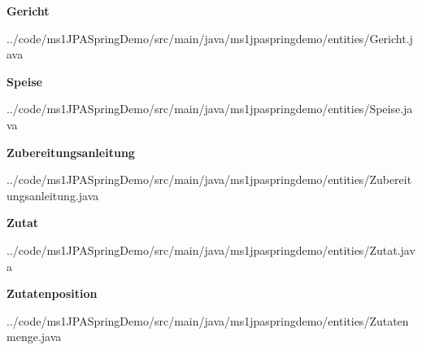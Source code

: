 \begin{mdframed}[style=codebox]
\textbf{Gericht}

{../code/ms1JPASpringDemo/src/main/java/ms1jpaspringdemo/entities/Gericht.java}
\end{mdframed}
\begin{mdframed}[style=codebox]
\textbf{Speise}

{../code/ms1JPASpringDemo/src/main/java/ms1jpaspringdemo/entities/Speise.java}
\end{mdframed}
\begin{mdframed}[style=codebox]
\textbf{Zubereitungsanleitung}

{../code/ms1JPASpringDemo/src/main/java/ms1jpaspringdemo/entities/Zubereitungsanleitung.java}
\end{mdframed}
\begin{mdframed}[style=codebox]
\textbf{Zutat}

{../code/ms1JPASpringDemo/src/main/java/ms1jpaspringdemo/entities/Zutat.java}
\end{mdframed}
\begin{mdframed}[style=codebox]
\textbf{Zutatenposition}

{../code/ms1JPASpringDemo/src/main/java/ms1jpaspringdemo/entities/Zutatenmenge.java}
\end{mdframed}
